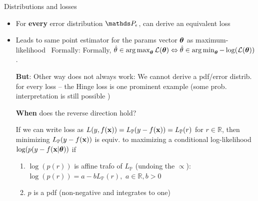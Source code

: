 \documentclass[11pt,compress,t,notes=noshow, xcolor=table]{beamer}
\begin{document}
\begin{vbframe}{Distributions and losses}

\begin{itemize}

\item For \textbf{every} error distribution $\P_\eps$, can derive an equivalent loss
\item Leads to same point estimator for the params vector $\bm{\theta}$ as maximum-likelihood
\
Formally: Formally, $\hat{\theta} \in \mathop{\mathrm{arg\,max}}_{\bm{\theta}} \mathcal{L}(\bm{\theta}) \Leftrightarrow \hat{\theta} \in \mathop{\mathrm{arg\,min}}_{\bm{\theta}}-\log(\mathcal{L}(\bm{\theta}))$.  %
    
\vspace{0.2cm}    
\textbf{But}: Other way does not always work: We cannot derive a pdf/error distrib. for every loss -- the Hinge loss is one prominent example (some prob. interpretation is still possible )

\vspace{0.2cm}
\textbf{When} does the reverse direction hold?

If we can write loss as $L(y,f(\mathbf{x}))=L_{\mathbb{P}}(y-f(\mathbf{x}))=L_{\mathbb{P}}(r)$ for $r \in \mathbb{R}$, then minimizing $L_{\mathbb{P}}(y-f(\mathbf{x}))$ is equiv. to maximizing a conditional log-likelihood $\log(p(y-f(\mathbf{x}|\bm{\theta}))$ if
\begin{enumerate}
 \setlength{\itemsep}{1.0em}
    \item $\log(p(r))$ is affine trafo of $L_{\mathbb{P}}$ (undoing the $\propto$):
    $\log(p(r)) = a - bL_{\mathbb{P}}(r),\,\,a \in \mathbb{R}, b>0$
    \item  $p$ is a pdf (non-negative and integrates to one)
\end{enumerate}


\end{itemize}


\end{vbframe}


\endlecture
\end{document}
